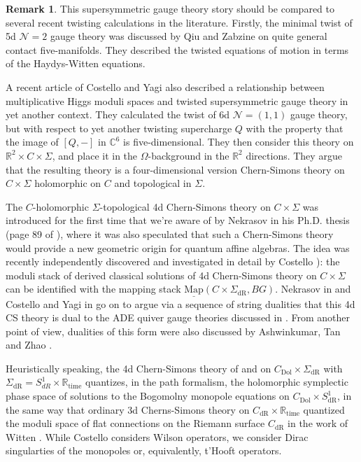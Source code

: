 \documentclass[11pt, oneside, reqno]{amsart}
\theoremstyle{definition} \newtheorem{definition}{Definition}[section]
\theoremstyle{definition} \newtheorem{remark}[definition]{Remark}
\theoremstyle{definition} \newtheorem{remarks}[definition]{Remarks}
\theoremstyle{definition} \newtheorem{question}[definition]{Question}
\theoremstyle{definition} \newtheorem*{note}{Note}
\theoremstyle{definition} \newtheorem{example}[definition]{Example}
\theoremstyle{definition} \newtheorem{examples}[definition]{Examples}
\newcommand{\mr}[1]{\mathrm{#1}}
\newcommand{\mc}[1]{\mathcal{#1}}
\newcommand{\ul}[1]{\underline{#1}}
\newcommand{\CC}{\mathbb{C}}
\newcommand{\RR}{\mathbb{R}}
\newcommand{\map}{\ul{\mr{Map}}}
\begin{document}
\begin{remark} \label{Kapustin_twist_remark}
This supersymmetric gauge theory story should be compared to several recent twisting calculations in the literature.  Firstly, the minimal twist of 5d $\mc N=2$ gauge theory was discussed by Qiu and Zabzine \cite{QiuZabzine} on quite general contact five-manifolds.  They described the twisted equations of motion in terms of the Haydys-Witten equations.

A recent article of Costello and Yagi \cite{CostelloYagi} also described a relationship between multiplicative Higgs moduli spaces and twisted supersymmetric gauge theory in yet another context.  They calculated the twist of 6d $\mc N=(1,1)$ gauge theory, but with respect to yet another twisting supercharge $Q$ with the property that the image of $[Q,-]$ in $\CC^6$ is five-dimensional.  They then consider this theory on $\RR^2 \times C \times \Sigma$, and place it in the $\Omega$-background in the $\RR^2$ directions.  They argue that the resulting theory is a four-dimensional version Chern-Simons theory on $C \times \Sigma$ holomorphic on $C$ and topological in $\Sigma$.

The $C$-holomorphic $\Sigma$-topological 4d Chern-Simons theory on $C \times \Sigma$  was introduced for the first time that we're aware of by Nekrasov in his Ph.D. thesis (page 89 of \cite{NekrasovThesis}), where it was also speculated that such a Chern-Simons theory
would provide a new geometric origin for quantum affine algebras. The idea was recently independently discovered and investigated in detail by Costello \cite{CostelloYangian}): the moduli stack of derived classical solutions of 4d Chern-Simons theory on $C \times \Sigma$ can be identified with the mapping stack $\map(C \times \Sigma_{\mr{dR}}, BG)$.  Nekrasov in \cite{NekrasovStringMath} and Costello and Yagi in \cite{CostelloYagi}  go on to argue via a sequence of string dualities that this 4d CS theory is dual to the ADE quiver gauge theories discussed in \cite{NekrasovPestun, NekrasovPestunShatashvili}.  From another point of view, dualities of this form were also discussed by Ashwinkumar, Tan and Zhao \cite{AshwinkumarTanZhao}.

Heuristically speaking, the 4d Chern-Simons theory of \cite{NekrasovThesis} and \cite{CostelloYangian} on $C_{\mathrm{Dol}} \times \Sigma_{\mathrm{dR}}$ with $\Sigma_{\mathrm{dR}} = S^{1}_{dR} \times \mathbb{R}_{\mathrm{time}}$ quantizes, in the path formalism, the holomorphic symplectic phase space of solutions to the Bogomolny monopole equations on $C_{\mathrm{Dol}} \times S^{1}_{\mathrm{dR}}$, in the same way that ordinary 3d Cherns-Simons theory on $C_{\mathrm{dR}} \times \mathbb{R}_{\mathrm{time}}$  quantized the moduli space
of flat connections on the Riemann surface $C_{\mathrm{dR}}$ in the work of Witten \cite{witten1989}.
While Costello \cite{CostelloYangian} considers Wilson operators,  we consider Dirac singularties of the monopoles or, equivalently, t'Hooft operators.
\end{remark}
\end{document}
